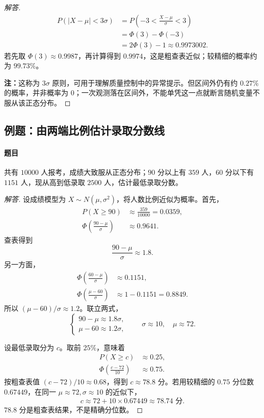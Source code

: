 \begin{proof}[解答]
\[
\begin{aligned}
P(|X-\mu|<3\sigma)
&=P\left(-3<\frac{X-\mu}{\sigma}<3\right)\\
&=\Phi(3)-\Phi(-3)\\
&=2\Phi(3)-1\approx0.9973002.
\end{aligned}
\]
若先取 $\Phi(3)\approx0.9987$，再计算得到 $0.9974$，这是粗查表近似；较精细的概率约为 $99.73\%$。

\textbf{注：}\quad 这称为 $3\sigma$ 原则，可用于理解质量控制中的异常提示。但区间外仍有约 $0.27\%$ 的概率，并非概率为 $0$；一次观测落在区间外，不能单凭这一点就断言随机变量不服从该正态分布。
\end{proof}

\subsection{例题：由两端比例估计录取分数线}\label{note:c2:e19}
\paragraph{题目}
共有 $10000$ 人报考，成绩大致服从正态分布；$90$ 分以上有 $359$ 人，$60$ 分以下有 $1151$ 人，现从高到低录取 $2500$ 人，估计最低录取分数。

\begin{proof}[解答]
设成绩模型为 $X\sim N(\mu,\sigma^2)$，将人数比例近似为概率。首先，
\[
\begin{aligned}
P(X\geq90)&\approx\frac{359}{10000}=0.0359,\\
\Phi\left(\frac{90-\mu}{\sigma}\right)&\approx0.9641.
\end{aligned}
\]
查表得到
\[
\frac{90-\mu}{\sigma}\approx1.8.
\]
另一方面，
\[
\begin{aligned}
\Phi\left(\frac{60-\mu}{\sigma}\right)
&\approx0.1151,\\
\Phi\left(\frac{\mu-60}{\sigma}\right)
&\approx1-0.1151=0.8849.
\end{aligned}
\]
所以 $(\mu-60)/\sigma\approx1.2$。联立两式，
\[
\begin{cases}
90-\mu\approx1.8\sigma,\\
\mu-60\approx1.2\sigma,
\end{cases}
\qquad
\sigma\approx10,\quad \mu\approx72.
\]

设最低录取分为 $c$。取前 $25\%$，意味着
\[
\begin{aligned}
P(X\geq c)&\approx0.25,\\
\Phi\left(\frac{c-72}{10}\right)&\approx0.75.
\end{aligned}
\]
按粗查表值 $(c-72)/10\approx0.68$，得到 $c\approx78.8$ 分。若用较精细的 $0.75$ 分位数 $0.67449$，在同一 $\mu\approx72,\sigma\approx10$ 的近似下，
\[
c\approx72+10\times0.67449\approx78.74\text{ 分}.
\]
$78.8$ 分是粗查表结果，不是精确分位数。
\end{proof}

